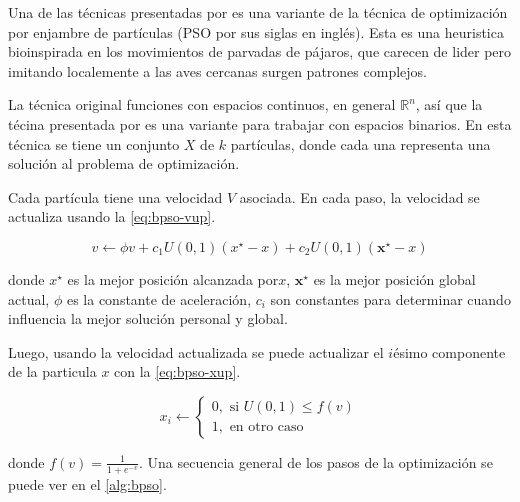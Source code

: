 Una de las técnicas presentadas por \cite{Canales2016} es una variante de la
técnica de optimización por enjambre de partículas (PSO por sus siglas en
inglés). Esta es una heuristica bioinspirada en los movimientos de parvadas
de pájaros, que carecen de lider pero imitando localemente a las aves cercanas
surgen patrones complejos.

La técnica original funciones con espacios continuos, en general
$\mathbb{R}^{n}$, así que la técina presentada por \cite{Canales2016} es una
variante para trabajar con espacios binarios. En esta técnica se tiene un
conjunto $X$ de $k$ partículas, donde cada una representa una solución al
problema de optimización.

Cada partícula tiene una velocidad $V$ asociada. En cada paso, la velocidad se
actualiza usando la \cref{eq:bpso-vup}.

\begin{equation}
  \label{eq:bpso-vup}
  v \gets \phi v + c_{1}U(0, 1)(x^{\star} - x)
  + c_{2}U(0, 1)(\mathbf{x}^{\star} - x)
\end{equation}

donde $x^{\star}$ es la mejor posición alcanzada por$x$, $\mathbf{x}^{\star}$ es
la mejor posición global actual, $\phi$ es la constante de aceleración, $c_{i}$
son constantes para determinar cuando influencia la mejor solución personal y
global.

Luego, usando la velocidad actualizada se puede actualizar el $i$ésimo
componente de la particula $x$ con la \cref{eq:bpso-xup}.

\begin{equation}
  \label{eq:bpso-xup}
  x_{i} \gets \begin{cases}
    0, \text{ si } U(0, 1) \leq f(v)\\
    1, \text{ en otro caso }
  \end{cases}
\end{equation}

donde $f(v) = \frac{1}{1+e^{-v}}$. Una secuencia general de los pasos de la
optimización se puede ver en el \cref{alg:bpso}.

